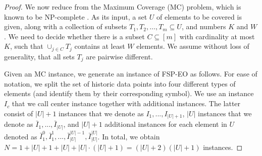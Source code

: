 \documentclass[11pt, a4paper]{article}
\newcommand{\fspeo}{FSP-EO\xspace}
\newcommand{\FRil}[1]{\todo[color=black, textcolor=white, inline, author=FR]{#1}}
\begin{document}
\begin{proof}
We now reduce from the Maximum Coverage (MC) problem, which is known to be NP-complete \citep{feige1995threshold}.
As its input, a set $U$ of elements to be covered is given, along with a collection of subsets $T_1, T_2, \ldots, T_m \subseteq U$, and numbers $K$ and $W$. We need to decide whether there is a subset $C\subseteq[m]$ with cardinality at most $K$, such that $\cup_{j\in C} T_j$ contains at least $W$ elements. We assume without loss of generality, that all sets $T_j$ are pairwise different. 


Given an MC instance, we generate an instance of \fspeo as follows.
For ease of notation, we split the set of historic data points into four different types of
elements (and identify them by their corresponding symbol). We use an instance $I_c$ that we call center instance
together with additional instances. The latter consist of $|U| + 1$
 instances
that we denote as $I_1, ..., I_{|U|+1}$, $|U|$
instances that we denote as $\bar{I}_1, ..., \bar{I}_{|U|}$, and
$|U|+1$  additional instances for each element in $U$ denoted as
$\bar{I}_1^0,\bar{I}_1^1,...,\bar{I}_{|U|}^{|U|-1},\bar{I}_{|U|}^{|U|}$. In
total, we obtain $N=1+|U|+1+|U|+|U|\cdot(|U|+1) = (|U|+2)(|U|+1)$
instances.


\end{proof}
\end{document}
